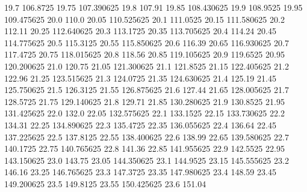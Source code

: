            19.7         106.8725
          19.75       107.390625
           19.8           107.91
          19.85       108.430625
           19.9         108.9525
          19.95       109.475625
           20.0            110.0
          20.05       110.525625
           20.1         111.0525
          20.15       111.580625
           20.2           112.11
          20.25       112.640625
           20.3         113.1725
          20.35       113.705625
           20.4           114.24
          20.45       114.775625
           20.5         115.3125
          20.55       115.850625
           20.6           116.39
          20.65       116.930625
           20.7         117.4725
          20.75       118.015625
           20.8           118.56
          20.85       119.105625
           20.9         119.6525
          20.95       120.200625
           21.0           120.75
          21.05       121.300625
           21.1         121.8525
          21.15       122.405625
           21.2           122.96
          21.25       123.515625
           21.3         124.0725
          21.35       124.630625
           21.4           125.19
          21.45       125.750625
           21.5         126.3125
          21.55       126.875625
           21.6           127.44
          21.65       128.005625
           21.7         128.5725
          21.75       129.140625
           21.8           129.71
          21.85       130.280625
           21.9         130.8525
          21.95       131.425625
           22.0            132.0
          22.05       132.575625
           22.1         133.1525
          22.15       133.730625
           22.2           134.31
          22.25       134.890625
           22.3         135.4725
          22.35       136.055625
           22.4           136.64
          22.45       137.225625
           22.5         137.8125
          22.55       138.400625
           22.6           138.99
          22.65       139.580625
           22.7         140.1725
          22.75       140.765625
           22.8           141.36
          22.85       141.955625
           22.9         142.5525
          22.95       143.150625
           23.0           143.75
          23.05       144.350625
           23.1         144.9525
          23.15       145.555625
           23.2           146.16
          23.25       146.765625
           23.3         147.3725
          23.35       147.980625
           23.4           148.59
          23.45       149.200625
           23.5         149.8125
          23.55       150.425625
           23.6           151.04
